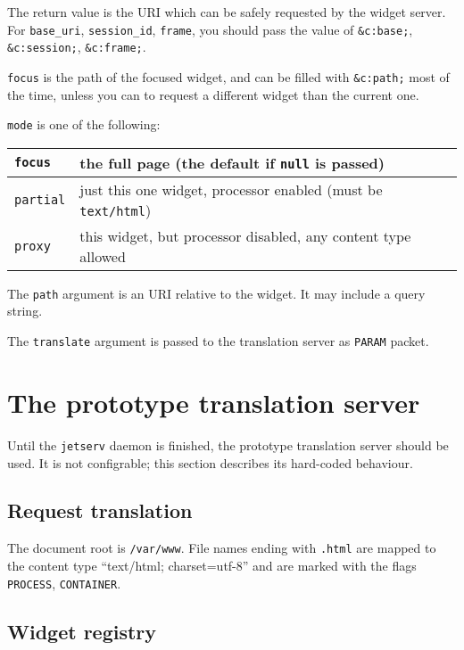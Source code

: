 \documentclass[a4paper,12pt]{article}
\begin{document}
The return value is the URI which can be safely requested by the
widget server.  For \texttt{base\_uri}, \texttt{session\_id},
\texttt{frame}, you should pass the value of \texttt{\&c:base;},
\texttt{\&c:session;}, \texttt{\&c:frame;}.

\texttt{focus} is the path of the focused widget, and can be filled
with \texttt{\&c:path;} most of the time, unless you can to request a
different widget than the current one.

\texttt{mode} is one of the following:

\begin{tabular}{|l|p{12cm}|}
\hline

\texttt{focus} & the full page (the default if \texttt{null} is
passed) \\

\hline

\texttt{partial} & just this one widget, processor enabled (must be
\texttt{text/html}) \\

\hline
\texttt{proxy} & this widget, but processor disabled, any content type
allowed \\
\hline
\end{tabular}

The \texttt{path} argument is an URI relative to the widget.  It may
include a query string.

The \texttt{translate} argument is passed to the translation server as
\texttt{PARAM} packet.


\section{The prototype translation server}

Until the \texttt{jetserv} daemon is finished, the prototype
translation server should be used.  It is not configrable; this
section describes its hard-coded behaviour.

\subsection{Request translation}

The document root is \texttt{/var/www}.  File names ending with
\texttt{.html} are mapped to the content type ``text/html;
charset=utf-8'' and are marked with the flags \texttt{PROCESS},
\texttt{CONTAINER}.

\subsection{Widget registry}
\end{document}
